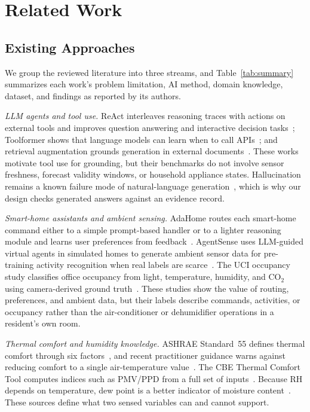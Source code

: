 \section{Related Work}\label{sec:related}
\subsection{Existing Approaches}
We group the reviewed literature into three streams, and Table~\ref{tab:summary} summarizes each work's problem limitation, AI method, domain knowledge, dataset, and findings as reported by its authors.

\textit{LLM agents and tool use.} ReAct interleaves reasoning traces with actions on external tools and improves question answering and interactive decision tasks~\cite{yao2023react}; Toolformer shows that language models can learn when to call APIs~\cite{schick2023toolformer}; and retrieval augmentation grounds generation in external documents~\cite{lewis2020rag}. These works motivate tool use for grounding, but their benchmarks do not involve sensor freshness, forecast validity windows, or household appliance states. Hallucination remains a known failure mode of natural-language generation~\cite{ji2023hallucination}, which is why our design checks generated answers against an evidence record.

\textit{Smart-home assistants and ambient sensing.} AdaHome routes each smart-home command either to a simple prompt-based handler or to a lighter reasoning module and learns user preferences from feedback~\cite{lim2026adahome}. AgentSense uses LLM-guided virtual agents in simulated homes to generate ambient sensor data for pre-training activity recognition when real labels are scarce~\cite{leng2025agentsense}. The UCI occupancy study classifies office occupancy from light, temperature, humidity, and CO$_2$ using camera-derived ground truth~\cite{candanedo2016occupancy}. These studies show the value of routing, preferences, and ambient data, but their labels describe commands, activities, or occupancy rather than the air-conditioner or dehumidifier operations in a resident's own room.

\textit{Thermal comfort and humidity knowledge.} ASHRAE Standard~55 defines thermal comfort through six factors~\cite{ashrae55}, and recent practitioner guidance warns against reducing comfort to a single air-temperature value~\cite{mishra2026myths}. The CBE Thermal Comfort Tool computes indices such as PMV/PPD from a full set of inputs~\cite{tartarini2020cbe}. Because RH depends on temperature, dew point is a better indicator of moisture content~\cite{nws_dewpoint,lawrence2005dewpoint}. These sources define what two sensed variables can and cannot support.

